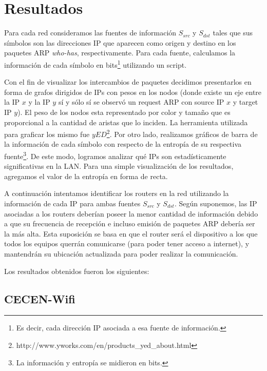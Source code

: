 \documentclass[10pt, a4paper]{article}
\begin{document}
\section{Resultados}

Para cada red consideramos las fuentes de información $S_{src}$ y $S_{dst}$ tales que sus símbolos son las direcciones IP que aparecen como origen y destino en los paquetes ARP \textit{who-has}, respectivamente. Para cada fuente, calculamos la información de cada símbolo en bits\footnote{Es decir, cada dirección IP asociada a esa fuente de información.} utilizando un script.

Con el fin de visualizar los intercambios de paquetes decidimos presentarlos en forma de grafos dirigidos de IPs con pesos en los nodos (donde existe un eje entre la IP $x$ y la IP $y$ sí y sólo sí se observó un request ARP con source IP $x$ y target IP $y$). El peso de los nodos esta representado por color y tamaño que es proporcional a la cantidad de aristas que lo inciden. %
La herramienta utilizada para graficar los mismo fue $yED$\footnote{http://www.yworks.com/en/products\_yed\_about.html}.
Por otro lado, realizamos gráficos de barra de la información de cada símbolo con respecto de la entropía de su respectiva fuente\footnote{La información y entropía se midieron en bits.}. De este modo, logramos analizar qué IPs son estadísticamente significativas en la LAN. Para una simple visualización de los resultados, agregamos el valor de la entropía en forma de recta.

A continuación intentamos identificar los routers en la red utilizando la información de cada IP para ambas fuentes $S_{src}$ y $S_{dst}$. Según suponemos, las IP asociadas a los routers deberían poseer la menor cantidad de información debido a que su frecuencia de recepción e incluso emisión de paquetes ARP debería ser la más alta. Esta suposición se basa en que el router será el dispositivo a los que todos los equipos querrán comunicarse (para poder tener acceso a internet), y mantendrán su ubicación actualizada para poder realizar la comunicación.

Los resultados obtenidos fueron los siguientes:

\subsection{CECEN-Wifi}
\end{document}
